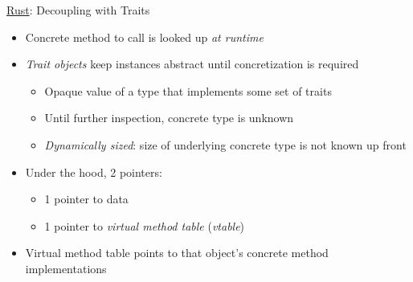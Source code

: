 \begin{frame}[fragile]{\underline{Rust}: Decoupling with Traits \hfill {\footnotesize \currentname}}


    \begin{itemize}

        \item Concrete method to call is looked up \textit{at runtime}

        \item \textit{Trait objects} keep instances abstract until concretization is required
            \begin{itemize}
                \item Opaque value of a type that implements some set of traits
                \item Until further inspection, concrete type is unknown
                \item \textit{Dynamically sized}: size of underlying concrete type is not known up front
            \end{itemize}

        \item Under the hood, 2 pointers:
            \begin{itemize}
                \item 1 pointer to data
                \item 1 pointer to \textit{virtual method table} (\textit{vtable})
            \end{itemize}

        \item Virtual method table points to that object's concrete method implementations

    \end{itemize}

    \vfill

\end{frame}

